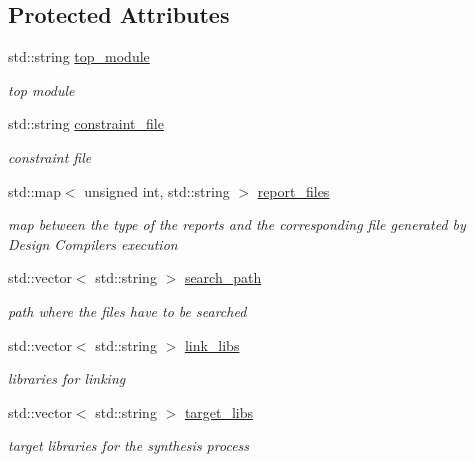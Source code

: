 \subsection*{Protected Attributes}
\begin{DoxyCompactItemize}
\item 
std\+::string \hyperlink{classDesignCompilerWrapper_a6e95ae9b696ba0d23c09d07c8648da7d}{top\+\_\+module}
\begin{DoxyCompactList}\small\item\em top module \end{DoxyCompactList}\item 
std\+::string \hyperlink{classDesignCompilerWrapper_a659e9d5700f46b5ea0980ee6a8545b69}{constraint\+\_\+file}
\begin{DoxyCompactList}\small\item\em constraint file \end{DoxyCompactList}\item 
std\+::map$<$ unsigned int, std\+::string $>$ \hyperlink{classDesignCompilerWrapper_aa7cff31353dc0ff6f0dc53ab35cda472}{report\+\_\+files}
\begin{DoxyCompactList}\small\item\em map between the type of the reports and the corresponding file generated by Design Compiler\textquotesingle{}s execution \end{DoxyCompactList}\item 
std\+::vector$<$ std\+::string $>$ \hyperlink{classDesignCompilerWrapper_a21bd3539fc18d671160efdb82457bb2b}{search\+\_\+path}
\begin{DoxyCompactList}\small\item\em path where the files have to be searched \end{DoxyCompactList}\item 
std\+::vector$<$ std\+::string $>$ \hyperlink{classDesignCompilerWrapper_a33785337e63af7a30d751a058f733fa7}{link\+\_\+libs}
\begin{DoxyCompactList}\small\item\em libraries for linking \end{DoxyCompactList}\item 
std\+::vector$<$ std\+::string $>$ \hyperlink{classDesignCompilerWrapper_a608e6f7bd836a32275d1cef0edc23d8b}{target\+\_\+libs}
\begin{DoxyCompactList}\small\item\em target libraries for the synthesis process \end{DoxyCompactList}\item 

\end{DoxyCompactItemize}
